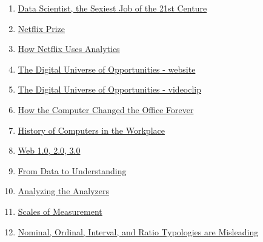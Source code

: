 \documentclass[]{tufte-book}
\providecommand{\tightlist}{%
  \setlength{\itemsep}{0pt}\setlength{\parskip}{0pt}}
\begin{document}
\begin{enumerate}
\def\labelenumi{\arabic{enumi}.}
\tightlist
\item
  \href{https://hbr.org/2012/10/data-scientist-the-sexiest-job-of-the-21st-century}{Data Scientist, the Sexiest Job of the 21st Centure}
\item
  \href{https://en.wikipedia.org/wiki/Netflix_Prize}{Netflix Prize}
\item
  \href{https://blog.kissmetrics.com/how-netflix-uses-analytics/}{How Netflix Uses Analytics}
\item
  \href{https://www.emc.com/leadership/digital-universe/2014iview/index.htm}{The Digital Universe of Opportunities - website}
\item
  \href{http://bcove.me/9s38pkjm}{The Digital Universe of Opportunities - videoclip}
\item
  \href{http://www.bbc.com/news/magazine-23509153}{How the Computer Changed the Office Forever}
\item
  \href{http://www.ehow.com/about_6362639_history-computers-workplace.html}{History of Computers in the Workplace}
\item
  \href{https://www.geeksforgeeks.org/web-1-0-web-2-0-and-web-3-0-with-their-difference/}{Web 1.0, 2.0, 3.0}
\item
  \href{https://en.wikipedia.org/wiki/File:DIKW_(1).png}{From Data to Understanding}
\item
  \href{http://www.oreilly.com/data/free/files/analyzing-the-analyzers.pdf}{Analyzing the Analyzers}
\item
  \href{http://www.mnestudies.com/research/scales-measurement}{Scales of Measurement}
\item
  \href{http://websites.uwlax.edu/tbrooks/eco307/handouts/velleman\%201993\%20-\%20typologies\%20misleading.pdf}{Nominal, Ordinal, Interval, and Ratio Typologies are Misleading}
\end{enumerate}


\end{document}
